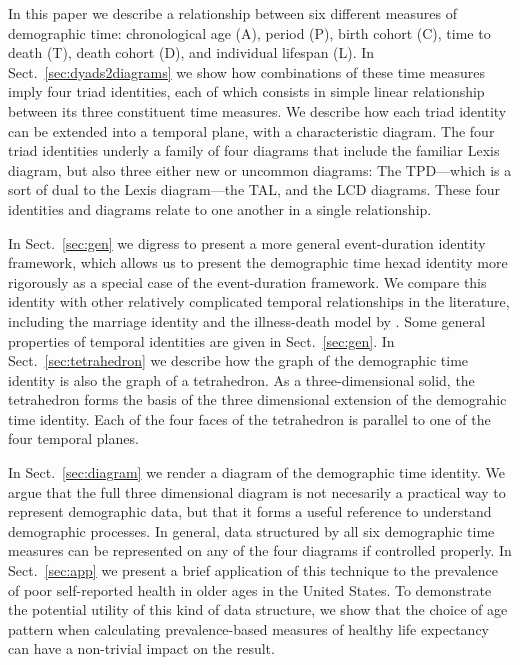 \documentclass[12pt,oneside,a4paper,doublespacing]{article} %
\theoremstyle{definition}
\begin{document}
In this paper we describe a relationship between six different measures of
demographic time: chronological age (A), period (P), birth cohort (C), time
to death (T), death cohort (D), and individual lifespan (L). In
Sect.~\ref{sec:dyads2diagrams} we show how combinations of these time measures imply four triad identities, each of which consists in simple linear relationship between its three
constituent time measures. We describe how each triad identity can be
extended into a temporal plane, with a characteristic diagram. The four triad
identities underly a family of four diagrams that include the
familiar Lexis diagram, but also three either new or
uncommon diagrams: The TPD---which is a sort of dual to the Lexis diagram---the TAL, and the LCD diagrams.
These four identities and diagrams relate to one another in a single relationship.

In Sect.~\ref{sec:gen} we digress to present a more general event-duration identity framework, which allows us to present the demographic time hexad identity more
rigorously as a special case of the event-duration framework. We compare this identity with other relatively complicated temporal
relationships in the literature, including the \citet{lexis1875einleitung}
marriage identity and the illness-death model by \citet{brinks2014lexis}. Some general
properties of temporal identities are given in
Sect.~\ref{sec:gen}.
In Sect.~\ref{sec:tetrahedron} we describe how the graph of the demographic time identity is also the graph of a tetrahedron. As a three-dimensional solid, the tetrahedron forms the basis of the three
dimensional extension of the demograhic time identity. Each of the four
faces of the tetrahedron is parallel to one of the four temporal planes.

In Sect.~\ref{sec:diagram} we render a diagram of the demographic time
identity. We argue that the full three dimensional diagram is not necesarily a
practical way to represent demographic data, but that it forms a useful
reference to understand demographic processes. In general, data structured by
all six demographic time measures can be represented on any of the four diagrams
if controlled properly. In Sect.~\ref{sec:app} we present a brief
application of this technique to the prevalence of poor self-reported health in
older ages in the United States. 
To demonstrate the potential utility of this kind of
data structure, we show that the choice of age pattern when calculating
prevalence-based measures of healthy life expectancy can have a non-trivial impact on the result.
\end{document}
